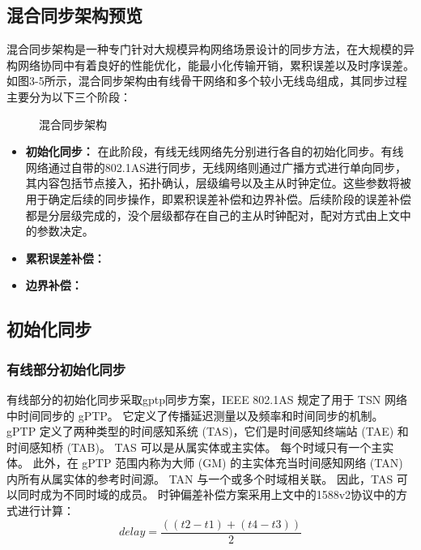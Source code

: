\documentclass[UTF8,a4paper,12pt]{ctexart}
\numberwithin{equation}{section}
\begin{document}
\subsection{混合同步架构预览}
混合同步架构是一种专门针对大规模异构网络场景设计的同步方法，在大规模的异构网络协同中有着良好的性能优化，能最小化传输开销，累积误差以及时序误差。如图3-5所示，混合同步架构由有线骨干网络和多个较小无线岛组成，其同步过程主要分为以下三个阶段：
\begin{figure}[htb]
	\caption{\label{1} 混合同步架构}
\end{figure}
\begin{itemize}
	\item \textbf{初始化同步：} 在此阶段，有线无线网络先分别进行各自的初始化同步。有线网络通过自带的802.1AS进行同步，无线网络则通过广播方式进行单向同步，其内容包括节点接入，拓扑确认，层级编号以及主从时钟定位。这些参数将被用于确定后续的同步操作，即累积误差补偿和边界补偿。后续阶段的误差补偿都是分层级完成的，没个层级都存在自己的主从时钟配对，配对方式由上文中的参数决定。
	\item \textbf{累积误差补偿：}
	\item \textbf{边界补偿：}
\end{itemize}
\subsection{初始化同步}
\subsubsection{有线部分初始化同步}
有线部分的初始化同步采取gptp同步方案，IEEE 802.1AS 规定了用于 TSN 网络中时间同步的 gPTP。 它定义了传播延迟测量以及频率和时间同步的机制。 gPTP 定义了两种类型的时间感知系统 (TAS)，它们是时间感知终端站 (TAE) 和时间感知桥 (TAB)。 TAS 可以是从属实体或主实体。 每个时域只有一个主实体。 此外，在 gPTP 范围内称为大师 (GM) 的主实体充当时间感知网络 (TAN) 内所有从属实体的参考时间源。 TAN 与一个或多个时域相关联。 因此，TAS 可以同时成为不同时域的成员。
时钟偏差补偿方案采用上文中的1588v2协议中的方式进行计算：
\begin{equation*}
	delay = \frac{((t2-t1)+(t4-t3))}{2} 
\end{equation*}
\end{document}
